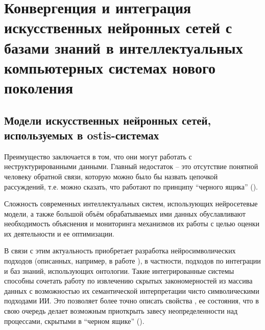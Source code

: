 \chapter{Конвергенция и интеграция искусственных нейронных сетей с базами знаний в интеллектуальных компьютерных системах нового поколения}
\label{chapter_ann}


\section{Модели искусственных нейронных сетей, используемых в ostis-системах}

Преимущество  заключается в том, что они могут работать с неструктурированными данными.
Главный недостаток  -- это отсутствие понятной человеку обратной связи, которую можно было бы назвать цепочкой
рассуждений, т.е. можно сказать, что  работают по принципу ``черного ящика'' ().

Сложность современных интеллектуальных систем, использующих нейросетевые модели, а также большой объём обрабатываемых ими данных обуславливают необходимость объяснения и мониторинга механизмов их работы с целью оценки их деятельности и ее оптимизации.

В связи с этим актуальность приобретает разработка нейросимволических подходов (описанных, например, в работе ), в частности, подходов по интеграции  и баз знаний, использующих онтологии. Такие интегрированные системы способны сочетать работу  по извлечению скрытых закономерностей из массива данных с возможностью их семантической интерпретации чисто символическими подходами ИИ. Это позволяет более точно описать свойства , ее состояния, что в свою очередь делает возможным приоткрыть завесу неопределенности над процессами, скрытыми в ``черном ящике'' ().


